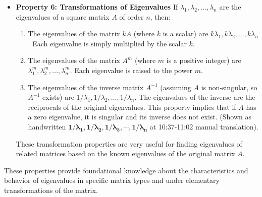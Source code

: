 \documentclass{article}
\begin{document}
\begin{itemize}
    \item \textbf{Property 6: Transformations of Eigenvalues}
    If $\lambda_1, \lambda_2, \dots, \lambda_n$ are the eigenvalues of a square matrix $A$ of order $n$, then:
    \begin{enumerate}
        \item The eigenvalues of the matrix $kA$ (where $k$ is a scalar) are $k\lambda_1, k\lambda_2, \dots, k\lambda_n$. Each eigenvalue is simply multiplied by the scalar $k$.
        \item The eigenvalues of the matrix $A^m$ (where $m$ is a positive integer) are $\lambda_1^m, \lambda_2^m, \dots, \lambda_n^m$. Each eigenvalue is raised to the power $m$.
        \item The eigenvalues of the inverse matrix $A^{-1}$ (assuming $A$ is non-singular, so $A^{-1}$ exists) are $1/\lambda_1, 1/\lambda_2, \dots, 1/\lambda_n$. The eigenvalues of the inverse are the reciprocals of the original eigenvalues. This property implies that if $A$ has a zero eigenvalue, it is singular and its inverse does not exist. (Shown as handwritten $\mathbf{1/ \lambda _ { 1 } , 1/ \lambda _ { 2 } , 1/ \lambda _ { 3 } , \cdots , 1/ \lambda _ { n }}$ at 10:37-11:02 manual translation).
    \end{enumerate}
   These transformation properties are very useful for finding eigenvalues of related matrices based on the known eigenvalues of the original matrix $A$.

\end{itemize}

These properties provide foundational knowledge about the characteristics and behavior of eigenvalues in specific matrix types and under elementary transformations of the matrix.
\end{document}
